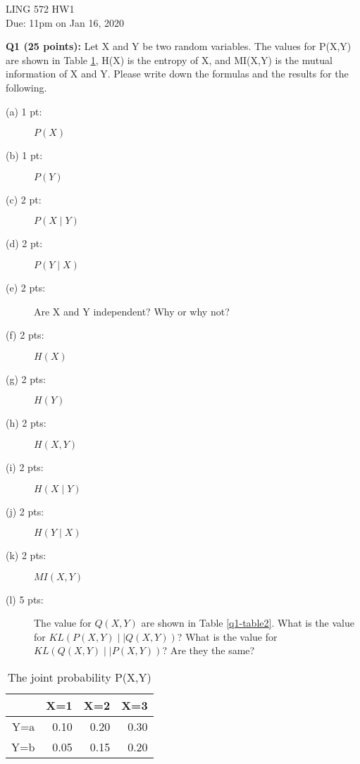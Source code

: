 \documentclass[11pt]{article}
\begin{document}
\begin{center}
\LARGE
LING 572 HW1\\
Due: 11pm on Jan 16, 2020\\
\vspace{0.3in}
\end{center}


\vspace{0.2 in}
\hspace{-0.3in}
{\bf Q1 (25 points):} Let X and Y be two random variables. 
  The values for P(X,Y) are shown in Table \ref{q1-table1},
  H(X) is the entropy of X, and MI(X,Y) is the mutual information of X and Y.
  Please write down the formulas and the results for the following.

\begin{description}
   \item [(a) 1 pt:] $P(X)$
   \item [(b) 1 pt:] $P(Y)$
   \item [(c) 2 pt:] $P(X \mid Y)$
   \item [(d) 2 pt:] $P(Y \mid X)$
   \item [(e) 2 pts:] Are X and Y independent? Why or why not?

   \item [(f) 2 pts:] $H(X)$
   \item [(g) 2 pts:] $H(Y)$
   \item [(h) 2 pts:] $H(X,Y)$
   \item [(i) 2 pts:] $H(X \mid Y)$
   \item [(j) 2 pts:] $H(Y \mid X)$

   \item [(k) 2 pts:] $MI(X,Y)$
   \item [(l) 5 pts:] 
       The value for $Q(X,Y)$ are shown in Table \ref{q1-table2}.
                What is the value for $KL(P(X,Y) \mid\mid Q(X,Y))$?
                What is the value for $KL(Q(X,Y) \mid\mid P(X,Y))$?
                Are they the same?
\end{description}

\begin{table}[btph]
\centering
\caption{The joint probability P(X,Y)}
\label{q1-table1}
\begin{tabular}{|r|r|r|r|}  \hline
    & X=1 & X=2 & X=3 \\ \hline
Y=a & 0.10 & 0.20 &  0.30 \\ \hline 
Y=b & 0.05 & 0.15 &  0.20 \\ \hline
\end{tabular}
\end{table}
\end{document}
